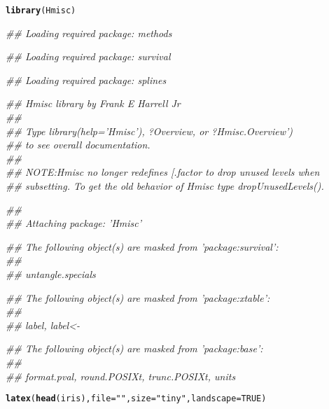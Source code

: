 \documentclass{article}\usepackage{graphicx, color}
\makeatletter
\newcommand{\hlfunctioncall}[1]{\textcolor[rgb]{0.501960784313725,0,0.329411764705882}{\textbf{#1}}}%
\newcommand{\hlstring}[1]{\textcolor[rgb]{0.6,0.6,1}{#1}}%
\newenvironment{kframe}{%
 \def\at@end@of@kframe{}%
 \ifinner\ifhmode%
  \def\at@end@of@kframe{\end{minipage}}%
  \begin{minipage}{\columnwidth}%
 \fi\fi%
 \def\FrameCommand##1{\hskip\@totalleftmargin \hskip-\fboxsep
 \colorbox{shadecolor}{##1}\hskip-\fboxsep
     \hskip-\linewidth \hskip-\@totalleftmargin \hskip\columnwidth}%
 \MakeFramed {\advance\hsize-\width
   \@totalleftmargin\z@ \linewidth\hsize
   \@setminipage}}%
 {\par\unskip\endMakeFramed%
 \at@end@of@kframe}
\makeatother
\begin{document}
\begin{kframe}
\begin{alltt}
\hlfunctioncall{library}(Hmisc)
\end{alltt}


{\ttfamily\noindent\itshape\textcolor{messagecolor}{\#\# Loading required package: methods}}

{\ttfamily\noindent\itshape\textcolor{messagecolor}{\#\# Loading required package: survival}}

{\ttfamily\noindent\itshape\textcolor{messagecolor}{\#\# Loading required package: splines}}

{\ttfamily\noindent\itshape\textcolor{messagecolor}{\#\# Hmisc library by Frank E Harrell Jr\\\#\# \\\#\# Type library(help='Hmisc'), ?Overview, or ?Hmisc.Overview')\\\#\# to see overall documentation.\\\#\# \\\#\# NOTE:Hmisc no longer redefines [.factor to drop unused levels when\\\#\# subsetting.  To get the old behavior of Hmisc type dropUnusedLevels().}}

{\ttfamily\noindent\itshape\textcolor{messagecolor}{\#\# \\\#\# Attaching package: 'Hmisc'}}

{\ttfamily\noindent\itshape\textcolor{messagecolor}{\#\# The following object(s) are masked from 'package:survival':\\\#\# \\\#\#     untangle.specials}}

{\ttfamily\noindent\itshape\textcolor{messagecolor}{\#\# The following object(s) are masked from 'package:xtable':\\\#\# \\\#\#     label, label<-}}

{\ttfamily\noindent\itshape\textcolor{messagecolor}{\#\# The following object(s) are masked from 'package:base':\\\#\# \\\#\#     format.pval, round.POSIXt, trunc.POSIXt, units}}\begin{alltt}
\hlfunctioncall{latex}(\hlfunctioncall{head}(iris), file = \hlstring{""}, size = \hlstring{"tiny"}, landscape = TRUE)
\end{alltt}
\end{kframe}
\end{document}
